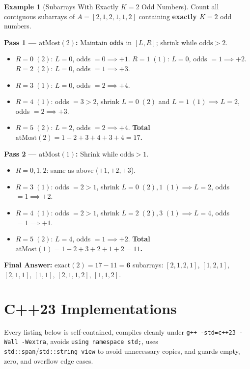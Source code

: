 \documentclass[11pt,a4paper]{article}
\theoremstyle{definition}
\newtheorem{example}{Example}[section]
\begin{document}
\begin{example}[Subarrays With Exactly $K = 2$ Odd Numbers]
Count all contiguous subarrays of $A = [2, 1, 2, 1, 1, 2]$ containing \textbf{exactly $K = 2$} odd numbers.

\textbf{Pass 1 --- $\text{atMost}(2)$:} Maintain \texttt{odds} in $[L, R]$; shrink while $\text{odds} > 2$.
\begin{itemize}[itemsep=1pt, topsep=2pt]
    \item $R=0\;(2)$: $L=0$, odds $=0 \implies +1$. \quad $R=1\;(1)$: $L=0$, odds $=1 \implies +2$. \quad $R=2\;(2)$: $L=0$, odds $=1 \implies +3$.
    \item $R=3\;(1)$: $L=0$, odds $=2 \implies +4$.
    \item $R=4\;(1)$: odds $=3 > 2$, shrink $L=0\;(2)$ and $L=1\;(1) \implies L=2$, odds $=2 \implies +3$.
    \item $R=5\;(2)$: $L=2$, odds $=2 \implies +4$. \quad \textbf{Total $\text{atMost}(2) = 1+2+3+4+3+4 = 17$.}
\end{itemize}

\textbf{Pass 2 --- $\text{atMost}(1)$:} Shrink while $\text{odds} > 1$.
\begin{itemize}[itemsep=1pt, topsep=2pt]
    \item $R=0,1,2$: same as above ($+1, +2, +3$).
    \item $R=3\;(1)$: odds $=2 > 1$, shrink $L=0\;(2), 1\;(1) \implies L=2$, odds $=1 \implies +2$.
    \item $R=4\;(1)$: odds $=2 > 1$, shrink $L=2\;(2), 3\;(1) \implies L=4$, odds $=1 \implies +1$.
    \item $R=5\;(2)$: $L=4$, odds $=1 \implies +2$. \quad \textbf{Total $\text{atMost}(1) = 1+2+3+2+1+2 = 11$.}
\end{itemize}

\textbf{Final Answer:} $\text{exact}(2) = 17 - 11 = \mathbf{6}$ subarrays: $[2,1,2,1]$, $[1,2,1]$, $[2,1,1]$, $[1,1]$, $[2,1,1,2]$, $[1,1,2]$.
\end{example}

\section{C++23 Implementations}

Every listing below is self-contained, compiles cleanly under \texttt{g++ -std=c++23 -Wall -Wextra}, avoids \texttt{using namespace std;}, uses \texttt{std::span}/\texttt{std::string\_view} to avoid unnecessary copies, and guards empty, zero, and overflow edge cases.
\end{document}
